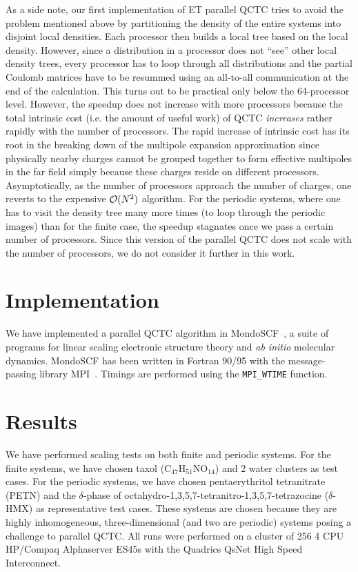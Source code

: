 \commentoutA{\documentclass[prl,aps,twocolumn,twocolumngrid,superbib]{revtex4}}
\begin{document}
As a side note, our first implementation of ET parallel QCTC tries to
avoid the problem mentioned above by partitioning the density of the
entire systems into disjoint local densities. Each processor then
builds a local tree based on the local density. However, since a
distribution in a processor does not ``see'' other local density
trees, every processor has to loop through all distributions and the
partial Coulomb matrices have to be resummed using an all-to-all
communication at the end of the calculation. This turns out to be
practical only below the 64-processor level. However, the speedup does
not increase with more processors because the total intrinsic cost
(i.e. the amount of useful work) of QCTC {\it increases} rather
rapidly with the number of processors. The rapid increase of intrinsic
cost has its root in the breaking down of the multipole expansion
approximation since physically nearby charges cannot be grouped
together to form effective multipoles in the far field simply because
these charges reside on different processors.  Asymptotically, as the
number of processors approach the number of charges, one reverts to
the expensive ${\cal O}(N^2)$ algorithm.  For the periodic systems,
where one has to visit the density tree many more times (to loop
through the periodic images) than for the finite case, the speedup
stagnates once we pass a certain number of processors. Since this
version of the parallel QCTC does not scale with the number of
processors, we do not consider it further in this work.

\section{Implementation}
\label{sec:implementation}
We have implemented a parallel QCTC algorithm in {\sc
MondoSCF}~\cite{MondoSCF}, a suite of programs for linear scaling
electronic structure theory and {\it ab initio}\/ molecular dynamics.
{\sc MondoSCF} has been written in Fortran 90/95 with the
message-passing library MPI~\cite{mpi}.  Timings are performed using
the {\tt MPI\_WTIME} function.

\section{Results}
\label{results}
We have performed scaling tests on both finite and periodic
systems. For the finite systems, we have chosen taxol
(C$_{47}$H$_{51}$NO$_{14}$) and 2 water clusters as test cases. For
the periodic systems, we have chosen pentaerythritol tetranitrate
(PETN)\cite{CGan04A} and the $\delta$-phase of
octahydro-1,3,5,7-tetranitro-1,3,5,7-tetrazocine
($\delta$-HMX)\cite{JPLewis00} as representative test cases. These
systems are chosen because they are highly inhomogeneous,
three-dimensional (and two are periodic) systems posing a challenge to
parallel QCTC. All runs were performed on a cluster of 256 4 CPU
HP/Compaq Alphaserver ES45s with the Quadrics QsNet High Speed
Interconnect.
\end{document}
